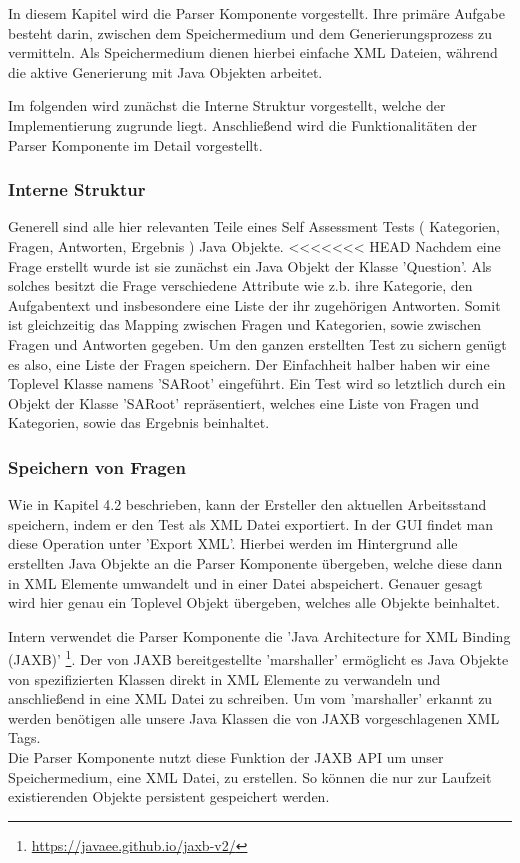 \label{Tim}
In diesem Kapitel wird die Parser Komponente vorgestellt.
Ihre primäre Aufgabe besteht darin, zwischen dem Speichermedium und dem Generierungsprozess zu vermitteln.
Als Speichermedium dienen hierbei einfache XML Dateien, während die aktive Generierung mit Java Objekten arbeitet.

Im folgenden wird zunächst die Interne Struktur vorgestellt, welche der Implementierung zugrunde liegt. Anschließend wird die Funktionalitäten der Parser Komponente im Detail vorgestellt. 

\subsubsection{Interne Struktur}
Generell sind alle hier relevanten Teile eines Self Assessment Tests ( Kategorien, Fragen, Antworten, Ergebnis ) Java Objekte. 
<<<<<<< HEAD
Nachdem eine Frage erstellt wurde ist sie zunächst ein Java Objekt der Klasse 'Question'.
Als solches besitzt die Frage verschiedene Attribute wie z.b. ihre Kategorie, den Aufgabentext und insbesondere eine Liste der ihr zugehörigen Antworten.
Somit ist gleichzeitig das Mapping zwischen Fragen und Kategorien, sowie zwischen Fragen und Antworten gegeben.
Um den ganzen erstellten Test zu sichern genügt es also, eine Liste der Fragen speichern.
Der Einfachheit halber haben wir eine Toplevel Klasse namens 'SARoot' eingeführt. 
Ein Test wird so letztlich durch ein Objekt der Klasse 'SARoot' repräsentiert, welches eine Liste von Fragen und Kategorien, sowie das Ergebnis beinhaltet.   

\subsubsection{Speichern von Fragen}
Wie in Kapitel 4.2 beschrieben, kann der Ersteller den aktuellen Arbeitsstand speichern, indem er den Test als XML Datei exportiert.
In der GUI findet man diese Operation unter 'Export XML'.
Hierbei werden im Hintergrund alle erstellten Java Objekte an die Parser Komponente übergeben, welche diese dann in XML Elemente umwandelt und in einer Datei abspeichert.
Genauer gesagt wird hier genau ein Toplevel Objekt übergeben, welches alle Objekte beinhaltet.

Intern verwendet die Parser Komponente die 'Java Architecture for XML Binding (JAXB)'
\footnote{\url{https://javaee.github.io/jaxb-v2/}\label{JAXB}}.
Der von JAXB bereitgestellte 'marshaller' ermöglicht es Java Objekte von spezifizierten Klassen direkt in XML Elemente zu verwandeln und anschließend in eine XML Datei zu schreiben.
Um vom 'marshaller' erkannt zu werden benötigen alle unsere Java Klassen die von JAXB vorgeschlagenen XML Tags.\\
Die Parser Komponente nutzt diese Funktion der JAXB API um unser Speichermedium, eine XML Datei, zu erstellen.
So können die nur zur Laufzeit existierenden Objekte persistent gespeichert werden.

